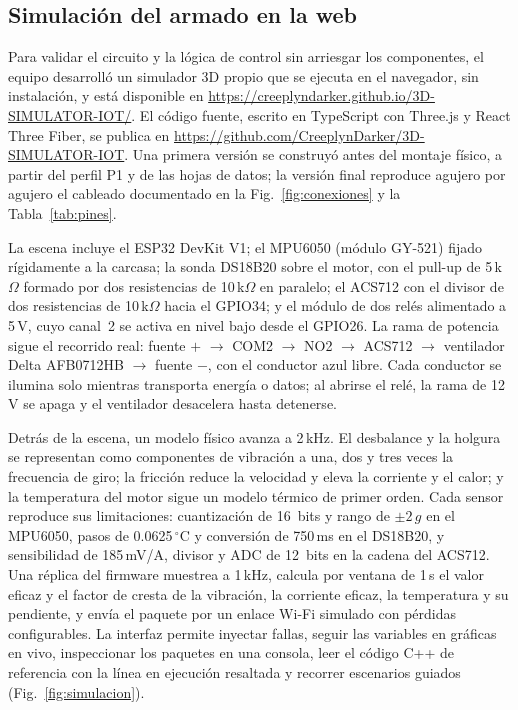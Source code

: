\documentclass[10pt,twocolumn]{article}
\begin{document}


\subsection{Simulación del armado en la web}
\label{sec:simulacion}

Para validar el circuito y la lógica de control sin arriesgar los componentes, el equipo
desarrolló un simulador 3D propio que se ejecuta en el navegador, sin instalación, y está
disponible en \url{https://creeplyndarker.github.io/3D-SIMULATOR-IOT/}. El código fuente,
escrito en TypeScript con Three.js y React Three Fiber, se publica en
\url{https://github.com/CreeplynDarker/3D-SIMULATOR-IOT}. Una primera versión se construyó
antes del montaje físico, a partir del perfil P1 y de las hojas de datos; la versión final
reproduce agujero por agujero el cableado documentado en la Fig.~\ref{fig:conexiones} y la
Tabla~\ref{tab:pines}.

La escena incluye el ESP32 DevKit V1; el MPU6050 (módulo GY-521) fijado rígidamente a la
carcasa; la sonda DS18B20 sobre el motor, con el pull-up de 5\,k$\Omega$ formado por dos
resistencias de 10\,k$\Omega$ en paralelo; el ACS712 con el divisor de dos resistencias de
10\,k$\Omega$ hacia el GPIO34; y el módulo de dos relés alimentado a 5\,V, cuyo canal~2 se
activa en nivel bajo desde el GPIO26. La rama de potencia sigue el recorrido real: fuente
$+$ $\rightarrow$ COM2 $\rightarrow$ NO2 $\rightarrow$ ACS712 $\rightarrow$ ventilador Delta
AFB0712HB $\rightarrow$ fuente $-$, con el conductor azul libre. Cada conductor se ilumina
solo mientras transporta energía o datos; al abrirse el relé, la rama de 12\,V se apaga y el
ventilador desacelera hasta detenerse.

Detrás de la escena, un modelo físico avanza a 2\,kHz. El desbalance y la holgura se
representan como componentes de vibración a una, dos y tres veces la frecuencia de giro; la
fricción reduce la velocidad y eleva la corriente y el calor; y la temperatura del motor sigue
un modelo térmico de primer orden. Cada sensor reproduce sus limitaciones: cuantización de
16~bits y rango de $\pm 2\,g$ en el MPU6050, pasos de 0.0625\,$^\circ$C y conversión de
750\,ms en el DS18B20, y sensibilidad de 185\,mV/A, divisor y ADC de 12~bits en la cadena del
ACS712. Una réplica del firmware muestrea a 1\,kHz, calcula por ventana de 1\,s el valor
eficaz y el factor de cresta de la vibración, la corriente eficaz, la temperatura y su
pendiente, y envía el paquete por un enlace Wi-Fi simulado con pérdidas configurables. La
interfaz permite inyectar fallas, seguir las variables en gráficas en vivo, inspeccionar los
paquetes en una consola, leer el código C++ de referencia con la línea en ejecución resaltada
y recorrer escenarios guiados (Fig.~\ref{fig:simulacion}).
\end{document}
